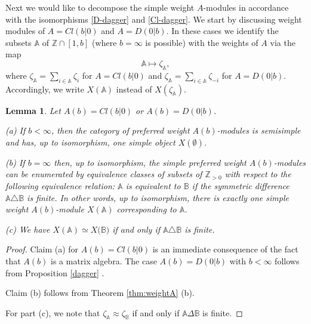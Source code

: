 \documentclass[12pt]{amsart}
\makeatletter
\def\@putname#1#2#3#4{\def\@@ref{#3}\let\old@bf\bf
        \def\bf##1{\old@bf\if?\noexpand##1?{#4}\else##1\fi}%
	#1{#2}%
        \let\bf\old@bf}
\def\@putname#1#2#3#4{\def\@@ref{#3}\let\old@bf\bf	%
	\let\old@reset@font\reset@font			%
        \def\bf##1{\old@bf\if?\noexpand##1?{#4}\else##1\fi}%
	\def\reset@font##1##2{\old@reset@font##1\if?\noexpand##2?{#4}\else##2\fi}#1{#2}%
        \let\bf\old@bf\let\reset@font\old@reset@font}
\let\my@ref=\ref
\def\ref#1{\@putname\my@ref{#1}{#1}{\tiny\rm\@@ref}}
\theoremstyle{plain} %
\numberwithin{equation}{section}
\theoremstyle{definition}
\theoremstyle{remark}
\theoremstyle{plain} %
\newtheorem{lemma}[definition]{Lemma}
\makeatother
\begin{document}
Next we would like to decompose the simple weight $A$-modules in accordance with the isomorphisms \eqref{D-dagger} and \eqref{Cl-dagger}. We start by discussing  weight modules of $A = Cl(b|0)$ and $A = D(0|b)$. In these cases we identify the  subsets $\mathbb A$ of $\mathbb Z \cap [1,b]$ (where $b=\infty$ is possible)  with the weights of $A$ via the map  $$\mathbb A \mapsto  \zeta_{\mathbb A},$$ where $\zeta_{\mathbb A} = \sum_{i \in \mathbb A} \zeta_i$ for $A = Cl(b|0)$ and $\zeta_{\mathbb A} = \sum_{i \in \mathbb A} \zeta_{-i}$ for $A = D(0|b)$. Accordingly, we  write $X(\mathbb A)$ instead of $X(\zeta_{\mathbb A})$. 

        \begin{lemma} \label{Clifford}   Let $A (b) = Cl(b|0)$ or $ A (b) = D(0|b)$. 
          
          (a) If $b < \infty$, then the category of preferred weight $ A (b)$-modules is semisimple and has,  up to isomorphism,  one simple object $X({\emptyset})$.

          
          (b)   If $b  = \infty$ then, up to isomorphism,  the simple preferred weight $ A (b)$-modules can be enumerated by equivalence
          classes of subsets of $\mathbb{Z}_{> 0}$ with respect  to the following equivalence relation: $\mathbb A$ is equivalent to $\mathbb B$ if the symmetric
          difference $\mathbb A\triangle \mathbb B$ is finite. In other words, up to isomorphism, there is exactly one simple weight $A(b)$-module $X ({\mathbb A})$ corresponding to ${\mathbb A}$. 
          
         (c)  We have 
           $X({\mathbb A}) \simeq X({\mathbb B)}$ if and only if $\mathbb A\triangle \mathbb B$ is finite.
          
        \end{lemma}
        \begin{proof} Claim (a) for  $ A (b) = Cl(b|0)$ is an immediate consequence of the fact that $ A (b)$  is a matrix algebra. The case  $ A (b) = D(0|b)$ with  $b < \infty$ follows from Proposition \ref{dagger}. 
        
        
         Claim (b)  follows from Theorem \ref{thm:weightA}(b).

For part (c), we note that 
$\zeta_{\mathbb A} \approx \zeta_{\mathbb B} $ if and only if $\mathbb A  \Delta \mathbb B $ is finite. 
                  \end{proof}

 
\end{document}
